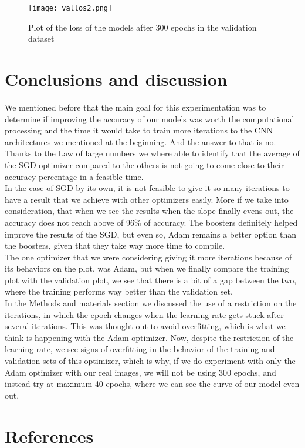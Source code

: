 \documentclass[review]{elsarticle}
\begin{document}
\begin{figure}[]
  \centering
  \texttt{[image: vallos2.png]}  
	\caption{Plot of the loss of the models after 300 epochs in the validation dataset}
\label{fig10}
\end{figure}


\section{Conclusions and discussion}\label{conclusions}

We mentioned before that the main goal for this experimentation was to determine if improving the accuracy of our models was worth the computational processing and the time it would take to train more iterations to the CNN architectures we mentioned at the beginning. And the answer to that is no.\\

Thanks to the Law of large numbers we where able to identify that the average of the SGD optimizer compared to the others is not going to come close to their accuracy percentage in a feasible time.\\

In the case of SGD by its own, it is not feasible to give it so many iterations to have a result that we achieve with other optimizers easily. More if we take into consideration, that when we see the results when the slope finally evens out, the accuracy does not reach above of 96\% of accuracy. The boosters definitely helped improve the results of the SGD, but even so, Adam remains a better option than the boosters, given that they take way more time to compile.\\

The one optimizer that we were considering giving it more iterations because of its behaviors on the plot, was Adam, but when we finally compare the training plot with the validation plot, we see that there is a bit of a gap between the two, where the training performs way better than the validation set. \\

In the Methods and materials section we discussed the use of a restriction on the iterations, in which the epoch changes when the learning rate gets stuck after several iterations. This was thought out to avoid overfitting, which is what we think is happening with the Adam optimizer. Now, despite the restriction of the learning rate, we see signs of overfitting in the behavior of the training and validation sets of this optimizer, which is why, if we do experiment with only the Adam optimizer with our real images, we will not be using 300 epochs, and instead try at maximum 40 epochs, where we can see the curve of our model even out.\\

\section*{References}


\end{document}
